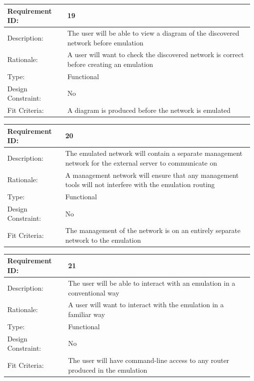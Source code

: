 \documentclass[11pt]{report}
\begin{document}
\newline
\vspace*{0.5 cm}
\newline
\begin{tabular}{|l|p{12cm}|}
	\hline Requirement ID: & 19 \\ 
	\hline Description: & The user will be able to view a diagram of the discovered network before emulation  \\ 
	\hline Rationale: & A user will want to check the discovered network is correct before creating an emulation \\ 
	\hline Type: & Functional \\ 
	\hline Design Constraint: & No \\ 
	\hline Fit Criteria: & A diagram is produced before the network is emulated  \\ 
	\hline 
\end{tabular}
\newline
\vspace*{0.5 cm}
\newline
\begin{tabular}{|l|p{12cm}|}
	\hline Requirement ID: & 20 \\ 
	\hline Description: & The emulated network will contain a separate management network for the external server to communicate on \\ 
	\hline Rationale: & A management network will ensure that any management tools will not interfere with the emulation routing \\ 
	\hline Type: & Functional \\ 
	\hline Design Constraint: & No \\ 
	\hline Fit Criteria: & The management of the network is on an entirely separate network to the emulation  \\ 
	\hline 
\end{tabular}
\newline
\vspace*{0.5 cm}
\newline
\begin{tabular}{|l|p{12cm}|}
	\hline Requirement ID: & 21 \\ 
	\hline Description: & The user will be able to interact with an emulation in a conventional way \\ 
	\hline Rationale: & A user will want to interact with the emulation in a familiar way \\ 
	\hline Type: & Functional \\ 
	\hline Design Constraint: & No \\ 
	\hline Fit Criteria: & The user will have command-line access to any router produced in the emulation  \\ 
	\hline 
\end{tabular}
\end{document}
